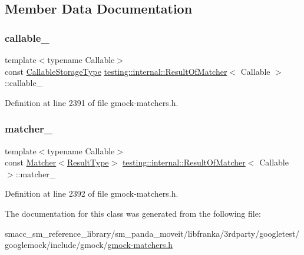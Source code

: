 \subsection{Member Data Documentation}
\mbox{\label{classtesting_1_1internal_1_1ResultOfMatcher_a0da13870ff65546571ed39ec798242aa}} 
\subsubsection{\texorpdfstring{callable\+\_\+}{callable\_}}
{\footnotesize\ttfamily template$<$typename Callable$>$ \\
const \hyperlink{classtesting_1_1internal_1_1ResultOfMatcher_a6f7f7d80162bebdf73681d6a3aa92c7d}{Callable\+Storage\+Type} \hyperlink{classtesting_1_1internal_1_1ResultOfMatcher}{testing\+::internal\+::\+Result\+Of\+Matcher}$<$ Callable $>$\+::callable\+\_\+\hspace{0.3cm}{\ttfamily [private]}}



Definition at line 2391 of file gmock-\/matchers.\+h.

\mbox{\label{classtesting_1_1internal_1_1ResultOfMatcher_ad74ae1b72a5f2045ea1e557e7c643887}} 
\subsubsection{\texorpdfstring{matcher\+\_\+}{matcher\_}}
{\footnotesize\ttfamily template$<$typename Callable$>$ \\
const \hyperlink{classtesting_1_1Matcher}{Matcher}$<$\hyperlink{classtesting_1_1internal_1_1ResultOfMatcher_aa9db2267792fcae2cfa3f57683f4e048}{Result\+Type}$>$ \hyperlink{classtesting_1_1internal_1_1ResultOfMatcher}{testing\+::internal\+::\+Result\+Of\+Matcher}$<$ Callable $>$\+::matcher\+\_\+\hspace{0.3cm}{\ttfamily [private]}}



Definition at line 2392 of file gmock-\/matchers.\+h.



The documentation for this class was generated from the following file\+:\begin{DoxyCompactItemize}
\item 
smacc\+\_\+sm\+\_\+reference\+\_\+library/sm\+\_\+panda\+\_\+moveit/libfranka/3rdparty/googletest/googlemock/include/gmock/\hyperlink{gmock-matchers_8h}{gmock-\/matchers.\+h}\end{DoxyCompactItemize}
